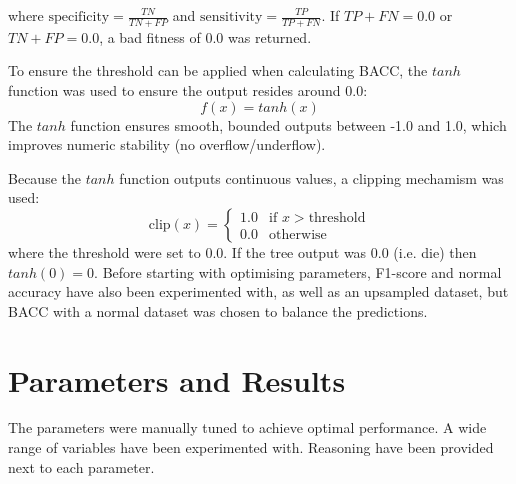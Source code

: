 \documentclass{article}
\begin{document}
where \(\text{specificity} = \frac{TN}{TN + FP}\) and \(\text{sensitivity} = \frac{TP}{TP + FN}\). If \(TP + FN = 0.0\) or \(TN + FP = 0.0\), a bad fitness of \(0.0\) was returned.

To ensure the threshold can be applied when calculating BACC, the \(tanh\) function was used to ensure the output resides around \(0.0\):
\begin{equation}\label{eq:sigmoid}
  f(x) = tanh(x)
\end{equation}
The \(tanh\) function ensures smooth, bounded outputs between -1.0 and 1.0, which improves numeric stability (no overflow/underflow).

Because the \(tanh\) function outputs continuous values, a clipping mechamism was used:
\begin{equation}
\text{clip}(x)=
    \begin{cases}
        1.0 & \text{if } x > \text{threshold}\\
        0.0 & \text{otherwise}
    \end{cases}
\end{equation}
where the threshold were set to 0.0. If the tree output was 0.0 (i.e. die) then \(tanh(0) = 0\). Before starting with optimising parameters, F1-score and normal accuracy have also been experimented with, as well as an upsampled dataset, but BACC with a normal dataset was chosen to balance the predictions.

\section{Parameters and Results}
\label{GPsetup}
The parameters were manually tuned to achieve optimal performance. A wide range of variables have been experimented with. Reasoning have been provided next to each parameter.
\end{document}
